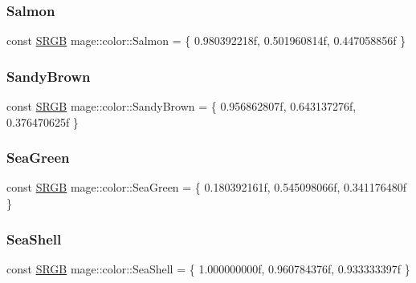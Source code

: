 \hypertarget{namespacemage_1_1color_abbd54dd94eeec47c4bb2f7336c10a45f}{}\label{namespacemage_1_1color_abbd54dd94eeec47c4bb2f7336c10a45f} 
\subsubsection{\texorpdfstring{Salmon}{Salmon}}
{\footnotesize\ttfamily const \hyperlink{structmage_1_1_s_r_g_b}{S\+R\+GB} mage\+::color\+::\+Salmon = \{ 0.\+980392218f, 0.\+501960814f, 0.\+447058856f \}}

\hypertarget{namespacemage_1_1color_aa08c46b7ef152452543752ee1397b64c}{}\label{namespacemage_1_1color_aa08c46b7ef152452543752ee1397b64c} 
\subsubsection{\texorpdfstring{Sandy\+Brown}{SandyBrown}}
{\footnotesize\ttfamily const \hyperlink{structmage_1_1_s_r_g_b}{S\+R\+GB} mage\+::color\+::\+Sandy\+Brown = \{ 0.\+956862807f, 0.\+643137276f, 0.\+376470625f \}}

\hypertarget{namespacemage_1_1color_a167c1d6fa656873256fa6a901996d3c9}{}\label{namespacemage_1_1color_a167c1d6fa656873256fa6a901996d3c9} 
\subsubsection{\texorpdfstring{Sea\+Green}{SeaGreen}}
{\footnotesize\ttfamily const \hyperlink{structmage_1_1_s_r_g_b}{S\+R\+GB} mage\+::color\+::\+Sea\+Green = \{ 0.\+180392161f, 0.\+545098066f, 0.\+341176480f \}}

\hypertarget{namespacemage_1_1color_acf2ba41926c518b4b0a48661c3bf358a}{}\label{namespacemage_1_1color_acf2ba41926c518b4b0a48661c3bf358a} 
\subsubsection{\texorpdfstring{Sea\+Shell}{SeaShell}}
{\footnotesize\ttfamily const \hyperlink{structmage_1_1_s_r_g_b}{S\+R\+GB} mage\+::color\+::\+Sea\+Shell = \{ 1.\+000000000f, 0.\+960784376f, 0.\+933333397f \}}

